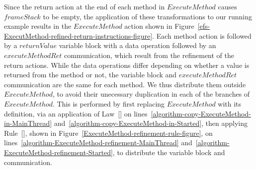 Since the return action at the end of each method in $ExecuteMethod$
causes $frameStack$ to be empty, the application of these
transformations to our running example results in the $ExecuteMethod$
action shown in
Figure~\ref{efs-ExecutMethod-refined-return-instructions-figure}.
Each method action is followed by a $returnValue$ variable block with
a data operation followed by an $executeMethodRet$ communication,
which result from the refinement of the return actions.
While the data operations differ depending on whether a value is
returned from the method or not, the variable block and
$executeMethodRet$ communication are the same for each method.
We thus distribute them outside $ExecuteMethod$, to avoid their
unecessary duplication in each of the branches of $ExecuteMethod$.
This is performed by first replacing $ExecuteMethod$ with its
definition, via an application of Law~[] on
lines~\ref{algorithm-copy-ExecuteMethod-in-MainThread}
and~\ref{algorithm-copy-ExecuteMethod-in-Started}, then applying
Rule~[], shown in
Figure~\ref{ExecuteMethod-refinement-rule-figure}, on
lines~\ref{algorithm-ExecuteMethod-refinement-MainThread}
and~\ref{algorithm-ExecuteMethod-refinement-Started}, to distribute
the variable block and communication.

